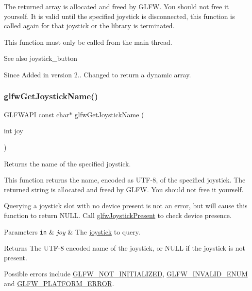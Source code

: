 The returned array is allocated and freed by G\+L\+FW. You should not free it yourself. It is valid until the specified joystick is disconnected, this function is called again for that joystick or the library is terminated.

This function must only be called from the main thread.

\begin{DoxySeeAlso}{See also}
joystick\+\_\+button
\end{DoxySeeAlso}
\begin{DoxySince}{Since}
Added in version 2..  Changed to return a dynamic array. 
\end{DoxySince}
\mbox{\label{group__input_gac50a4fd9b01886cf9fa2c45f19191fb8}} 
\subsubsection{\texorpdfstring{glfw\+Get\+Joystick\+Name()}{glfwGetJoystickName()}}
{\footnotesize\ttfamily G\+L\+F\+W\+A\+PI const char$\ast$ glfw\+Get\+Joystick\+Name (\begin{DoxyParamCaption}\item[{int}]{joy }\end{DoxyParamCaption})}



Returns the name of the specified joystick. 

This function returns the name, encoded as U\+T\+F-\/8, of the specified joystick. The returned string is allocated and freed by G\+L\+FW. You should not free it yourself.

Querying a joystick slot with no device present is not an error, but will cause this function to return {\ttfamily N\+U\+LL}. Call \hyperlink{group__input_ga7f81f22f355f4b7d315caf73cdfd9906}{glfw\+Joystick\+Present} to check device presence.


\begin{DoxyParams}[1]{Parameters}
\mbox{\tt in}  & {\em joy} & The \hyperlink{group__joysticks}{joystick} to query. \\
\hline
\end{DoxyParams}
\begin{DoxyReturn}{Returns}
The U\+T\+F-\/8 encoded name of the joystick, or {\ttfamily N\+U\+LL} if the joystick is not present.
\end{DoxyReturn}
Possible errors include \hyperlink{group__errors_ga2374ee02c177f12e1fa76ff3ed15e14a}{G\+L\+F\+W\+\_\+\+N\+O\+T\+\_\+\+I\+N\+I\+T\+I\+A\+L\+I\+Z\+ED}, \hyperlink{group__errors_ga76f6bb9c4eea73db675f096b404593ce}{G\+L\+F\+W\+\_\+\+I\+N\+V\+A\+L\+I\+D\+\_\+\+E\+N\+UM} and \hyperlink{group__errors_gad44162d78100ea5e87cdd38426b8c7a1}{G\+L\+F\+W\+\_\+\+P\+L\+A\+T\+F\+O\+R\+M\+\_\+\+E\+R\+R\+OR}.

